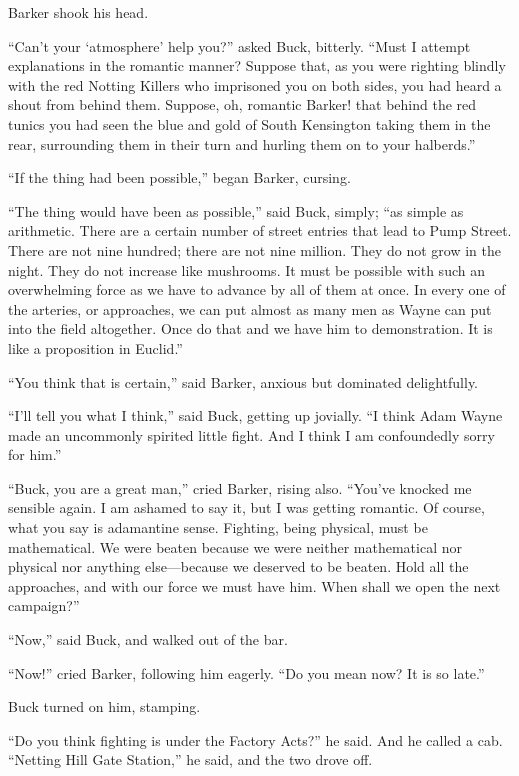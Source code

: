 \documentclass{book}
\begin{document}
Barker shook his head.

“Can’t your ‘atmosphere’ help you?” asked Buck, bitterly. “Must I attempt explanations in the romantic manner? Suppose that, as you were righting blindly with the red Notting Killers who imprisoned you on both sides, you had heard a shout from behind them. Suppose, oh, romantic Barker! that behind the red tunics you had seen the blue and gold of South Kensington taking them in the rear, surrounding them in their turn and hurling them on to your halberds.”

“If the thing had been possible,” began Barker, cursing.

“The thing would have been as possible,” said Buck, simply; “as simple as arithmetic. There are a certain number of street entries that lead to Pump Street. There are not nine hundred; there are not nine million. They do not grow in the night. They do not increase like mushrooms. It must be possible with such an overwhelming force as we have to advance by all of them at once. In every one of the arteries, or approaches, we can put almost as many men as Wayne can put into the field altogether. Once do that and we have him to demonstration. It is like a proposition in Euclid.”

“You think that is certain,” said Barker, anxious but dominated delightfully.

“I’ll tell you what I think,” said Buck, getting up jovially. “I think Adam Wayne made an uncommonly spirited little fight. And I think I am confoundedly sorry for him.”

“Buck, you are a great man,” cried Barker, rising also. “You’ve knocked me sensible again. I am ashamed to say it, but I was getting romantic. Of course, what you say is adamantine sense. Fighting, being physical, must be mathematical. We were beaten because we were neither mathematical nor physical nor anything else—because we deserved to be beaten. Hold all the approaches, and with our force we must have him. When shall we open the next campaign?”

“Now,” said Buck, and walked out of the bar.

“Now!” cried Barker, following him eagerly. “Do you mean now? It is so late.”

Buck turned on him, stamping.

“Do you think fighting is under the Factory Acts?” he said. And he called a cab. “Netting Hill Gate Station,” he said, and the two drove off.
\end{document}
